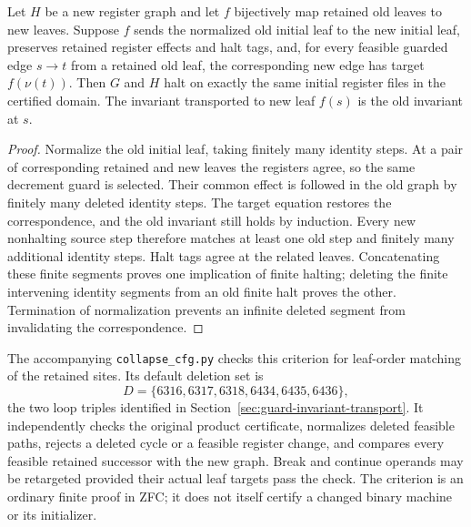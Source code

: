 \begin{theorem}
Let $H$ be a new register graph and let $f$ bijectively map retained old
leaves to new leaves.  Suppose $f$ sends the normalized old initial leaf to the
new initial leaf, preserves retained register effects and halt tags,
and, for every feasible guarded edge $s\to t$ from a retained old leaf,
the corresponding new edge has target $f(\nu(t))$.  Then $G$ and $H$
halt on exactly the same initial register files in the certified
domain.  The invariant transported to new leaf $f(s)$ is the old
invariant at $s$.
\end{theorem}
\begin{proof}
Normalize the old initial leaf, taking finitely many identity steps.
At a pair of corresponding retained and new leaves the registers agree,
so the same decrement guard is selected.  Their common effect is
followed in the old graph by finitely many deleted identity steps.
The target equation restores the correspondence, and the old invariant
still holds by induction.  Every new nonhalting source step therefore
matches at least one old step and finitely many additional identity
steps.  Halt tags agree at the related leaves.  Concatenating these
finite segments proves one implication of finite halting; deleting the
finite intervening identity segments from an old finite halt proves
the other.  Termination of normalization prevents an infinite deleted
segment from invalidating the correspondence.
\end{proof}

The accompanying \texttt{collapse\_cfg.py} checks this criterion for
leaf-order matching of the retained sites.  Its default deletion set
is
\[
 D=\{6316,6317,6318,6434,6435,6436\},
\]
the two loop triples identified in
Section~\ref{sec:guard-invariant-transport}.  It independently checks
the original product certificate, normalizes deleted feasible paths,
rejects a deleted cycle or a feasible register change, and compares
every feasible retained successor with the new graph.  Break and
continue operands may be retargeted provided their actual leaf targets
pass the check.  The criterion is an ordinary finite proof in ZFC;
it does not itself certify a changed binary machine or its initializer.

